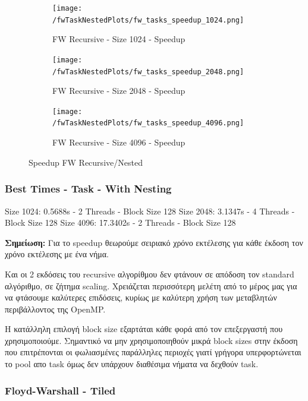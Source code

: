 \documentclass[letterpaper,12pt]{article}
\begin{document}
\begin{figure}[H]
    \centering
    \begin{subfigure}[b]{0.48\linewidth}
        \texttt{[image: /fwTaskNestedPlots/fw\_tasks\_speedup\_1024.png]}
        \caption{FW Recursive - Size 1024 - Speedup}
    \end{subfigure}
    \begin{subfigure}[b]{0.48\linewidth}
        \texttt{[image: /fwTaskNestedPlots/fw\_tasks\_speedup\_2048.png]}
        \caption{FW Recursive - Size 2048 - Speedup}
    \end{subfigure}
    \begin{subfigure}[b]{0.5\linewidth}
        \texttt{[image: /fwTaskNestedPlots/fw\_tasks\_speedup\_4096.png]}
        \caption{FW Recursive - Size 4096 - Speedup}
    \end{subfigure}
    \caption{Speedup FW Recursive/Nested}
    \label{fig:Speedup FW Recursive/Nested}
\end{figure}

\subsubsection*{Best Times - Task - With Nesting}
Size 1024: 0.5688s - 2 Threads - Block Size 128
\newline
Size 2048: 3.1347s - 4 Threads - Block Size 128
\newline
Size 4096: 17.3402s - 2 Threads - Block Size 128
\newline

\textbf{Σημείωση:} Για το speedup θεωρούμε σειριακό χρόνο εκτέλεσης για κάθε έκδοση τον χρόνο εκτέλεσης
με ένα νήμα. 

\vspace{4pt}

Και οι 2 εκδόσεις του recursive αλγορίθμου δεν φτάνουν σε απόδοση τον standard αλγόριθμο, σε ζήτημα scaling.
Χρειάζεται περισσότερη μελέτη από το μέρος μας για να φτάσουμε καλύτερες επιδόσεις, κυρίως
με καλύτερη χρήση των μεταβλητών περιβάλλοντος της OpenMP.

Η κατάλληλη επιλογή block size εξαρτάται κάθε φορά από τον επεξεργαστή που χρησιμοποιούμε.
Σημαντικό να μην χρησιμοποιηθούν μικρά block sizes στην έκδοση που επιτρέπονται οι φωλιασμένες
παράλληλες περιοχές γιατί γρήγορα υπερφορτώνεται το pool απο task όμως δεν υπάρχουν
διαθέσιμα νήματα να δεχθούν task.


\subsubsection{Floyd-Warshall - Tiled}
\end{document}
